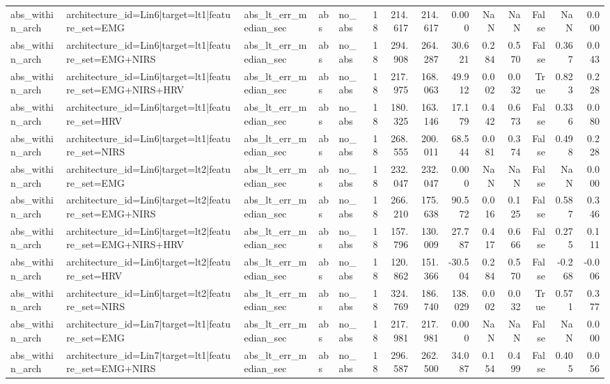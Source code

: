 \begin{table}
\begin{tabular}{lllllrrrrrrrrr}
abs_within_arch & architecture_id=Lin6|target=lt1|feature_set=EMG & abs_lt_err_median_sec & abs & no_abs & 18 & 214.617 & 214.617 & 0.000 & NaN & NaN & False & NaN & 0.000 \\
abs_within_arch & architecture_id=Lin6|target=lt1|feature_set=EMG+NIRS & abs_lt_err_median_sec & abs & no_abs & 18 & 294.908 & 264.287 & 30.621 & 0.284 & 0.570 & False & 0.367 & 0.043 \\
abs_within_arch & architecture_id=Lin6|target=lt1|feature_set=EMG+NIRS+HRV & abs_lt_err_median_sec & abs & no_abs & 18 & 217.975 & 168.063 & 49.912 & 0.002 & 0.032 & True & 0.823 & 0.228 \\
abs_within_arch & architecture_id=Lin6|target=lt1|feature_set=HRV & abs_lt_err_median_sec & abs & no_abs & 18 & 180.325 & 163.146 & 17.179 & 0.442 & 0.673 & False & 0.336 & 0.080 \\
abs_within_arch & architecture_id=Lin6|target=lt1|feature_set=NIRS & abs_lt_err_median_sec & abs & no_abs & 18 & 268.555 & 200.011 & 68.544 & 0.081 & 0.374 & False & 0.498 & 0.228 \\
abs_within_arch & architecture_id=Lin6|target=lt2|feature_set=EMG & abs_lt_err_median_sec & abs & no_abs & 18 & 232.047 & 232.047 & 0.000 & NaN & NaN & False & NaN & 0.000 \\
abs_within_arch & architecture_id=Lin6|target=lt2|feature_set=EMG+NIRS & abs_lt_err_median_sec & abs & no_abs & 18 & 266.210 & 175.638 & 90.572 & 0.016 & 0.125 & False & 0.587 & 0.346 \\
abs_within_arch & architecture_id=Lin6|target=lt2|feature_set=EMG+NIRS+HRV & abs_lt_err_median_sec & abs & no_abs & 18 & 157.796 & 130.009 & 27.787 & 0.417 & 0.666 & False & 0.275 & 0.111 \\
abs_within_arch & architecture_id=Lin6|target=lt2|feature_set=HRV & abs_lt_err_median_sec & abs & no_abs & 18 & 120.862 & 151.366 & -30.504 & 0.284 & 0.570 & False & -0.268 & -0.006 \\
abs_within_arch & architecture_id=Lin6|target=lt2|feature_set=NIRS & abs_lt_err_median_sec & abs & no_abs & 18 & 324.769 & 186.740 & 138.029 & 0.002 & 0.032 & True & 0.571 & 0.377 \\
abs_within_arch & architecture_id=Lin7|target=lt1|feature_set=EMG & abs_lt_err_median_sec & abs & no_abs & 18 & 217.981 & 217.981 & 0.000 & NaN & NaN & False & NaN & 0.000 \\
abs_within_arch & architecture_id=Lin7|target=lt1|feature_set=EMG+NIRS & abs_lt_err_median_sec & abs & no_abs & 18 & 296.587 & 262.500 & 34.087 & 0.154 & 0.499 & False & 0.405 & 0.056 \\

\end{tabular}
\end{table}
